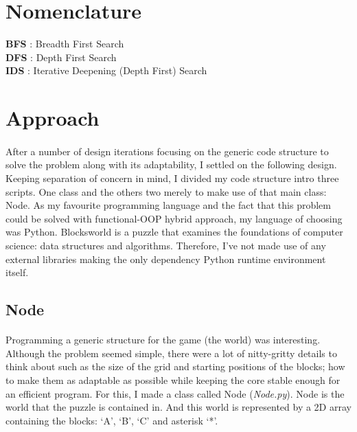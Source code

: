 \documentclass[10pt]{article}
\begin{document}
\newpage																		

\tableofcontents 


\section*{Nomenclature}
\textbf{BFS} : Breadth First Search \\
\textbf{DFS} : Depth First Search \\
\textbf{IDS} : Iterative Deepening (Depth First) Search

\newpage

  \section{Approach}
  \paragraph{} \indent
  After a number of design iterations focusing on the generic code structure to solve the problem along with its adaptability, I settled on the following design. Keeping separation of concern in mind, I divided my code structure intro three scripts. One class and the others two merely to make use of that main class: Node. As my favourite programming language and the fact that this problem could be solved with functional-OOP hybrid approach, my language of choosing was Python. Blocksworld is a puzzle that examines the foundations of computer science: data structures and algorithms. Therefore, I’ve not made use of any external libraries making the only dependency Python runtime environment itself.

  \subsection{Node}
  \paragraph{} \indent
  Programming a generic structure for the game (the world) was interesting. Although the problem seemed simple, there were a lot of nitty-gritty details to think about such as the size of the grid and starting positions of the blocks; how to make them as adaptable as possible while keeping the core stable enough for an efficient program. For this, I made a class called Node (\textit{Node.py}). Node is the world that the puzzle is contained in. And this world is represented by a 2D array containing the blocks: `A', `B', `C' and asterisk `*'. \\
  
\end{document}

